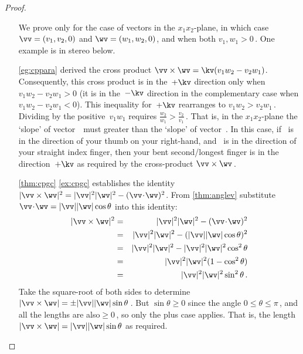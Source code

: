 \begin{proof}
\begin{enumerate}
We prove only for the case of vectors in the \(x_1x_2\)-plane, in which case \(\vv=(v_1,v_2,0)\) and \(\wv=(w_1,w_2,0)\), and when both \(v_1,w_1>0\)\,.
One example is in stereo below.
\begin{center}
\end{center}
\autoref{eg:cppara} derived the cross product \(\vv\times\wv=\kv(v_1w_2-v_2w_1)\).
Consequently, this cross product is in the~\(+\kv\) direction only when \(v_1w_2-v_2w_1>0\) (it is in the~\(-\kv\) direction in the complementary case when \(v_1w_2-v_2w_1<0\)). 
This inequality for~\(+\kv\) rearranges to \(v_1w_2>v_2w_1\)\,.
Dividing by the positive~\(v_1w_1\) requires \(\frac{w_2}{w_1}>\frac{v_2}{v_1}\)\,.
That is, in the \(x_1x_2\)-plane the `slope' of vector~\wv\ must greater than the `slope' of vector~\vv.
In this case, if \vv~is in the direction of your thumb on your right-hand, and \wv~is in the direction of your straight index finger, then your bent second\slash longest finger is in the direction~\(+\kv\) as required by the cross-product \(\vv\times\wv\)\,.

\item[\ref{thm:cpgc}] \autoref{ex:cpgc} establishes the identity \(|\vv\times\wv|^2=|\vv|^2|\wv|^2-(\vv\cdot\wv)^2\).
From \autoref{thm:anglev} substitute \(\vv\cdot\wv=|\vv||\wv|\cos\theta\) into this identity:
\begin{eqnarray*}
|\vv\times\wv|^2&=&|\vv|^2|\wv|^2-(\vv\cdot\wv)^2
\\&=&|\vv|^2|\wv|^2-(|\vv||\wv|\cos\theta)^2
\\&=&|\vv|^2|\wv|^2-|\vv|^2|\wv|^2\cos^2\theta
\\&=&|\vv|^2|\wv|^2(1-\cos^2\theta)
\\&=&|\vv|^2|\wv|^2\sin^2\theta\,.
\end{eqnarray*}
Take the square-root of both sides to determine \(|\vv\times\wv|=\pm|\vv||\wv|\sin\theta\)\,.
But \(\sin\theta\geq0\) since the angle \(0\leq\theta\leq\pi\)\,, and all the lengths are also\({}\geq0\)\,, so only the plus case applies.
That is, the length \(|\vv\times\wv|=|\vv||\wv|\sin\theta\) as required.


\end{enumerate}
\end{proof}
